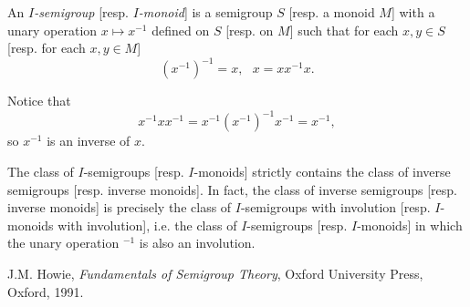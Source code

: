 \documentclass[12pt]{article}
\begin{document}
An \emph{$I$-semigroup} [resp. \emph{$I$-monoid}] is a semigroup $S$ [resp. a monoid $M$] with a unary operation $x\mapsto x^{-1}$ defined on $S$ [resp. on $M$] such that for each $x,y\in S$ [resp. for each $x,y\in M$] $$(x^{-1})^{-1}=x,\ \ \ x=xx^{-1}x.$$

Notice that $$x^{-1}xx^{-1}=x^{-1}(x^{-1})^{-1}x^{-1}=x^{-1},$$ so $x^{-1}$ is an inverse of $x$.

The class of $I$-semigroups [resp. $I$-monoids] strictly contains the class of inverse semigroups [resp. inverse monoids]. In fact, the class of inverse semigroups [resp. inverse monoids] is precisely the class of $I$-semigroups with involution [resp. $I$-monoids with involution], i.e. the class of $I$-semigroups  [resp. $I$-monoids] in which the unary operation $^{-1}$ is also an involution.

\begin{thebibliography}{9}
 J.M. Howie, \emph{Fundamentals of Semigroup Theory}, Oxford University Press, Oxford, 1991.
\end{thebibliography}
\end{document}
